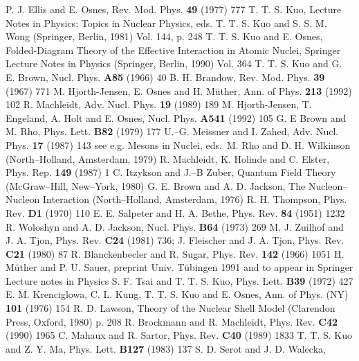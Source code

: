 \clearpage
\footnotesize{\begin{thebibliography}{99}
 P. J. Ellis and E. Osnes, Rev. Mod. Phys. {\bf 49} (1977) 777
 T. T. S. Kuo, Lecture Notes in
Physics; Topics in Nuclear Physics, eds. T. T. S. Kuo and S. S.
M. Wong  (Springer, Berlin, 1981) Vol. 144, p. 248
 T. T. S. Kuo and E. Osnes, Folded-Diagram Theory
of the Effective Interaction in Atomic Nuclei, Springer Lecture
Notes in Physics (Springer, Berlin, 1990) Vol. 364
 T. T. S. Kuo and G. E. Brown, Nucl. Phys. {\bf A85}
(1966) 40
 B. H. Brandow, Rev. Mod. Phys. {\bf 39} (1967) 771
 M. Hjorth-Jensen, E. Osnes and H. M\"{u}ther,
Ann. of Phys.  {\bf 213} (1992) 102
 R. Machleidt, Adv. Nucl. Phys. {\bf 19} (1989) 189
 M. Hjorth-Jensen, T. Engeland, A. Holt and
E. Osnes,
Nucl. Phys. {\bf A541} (1992) 105
 G. E Brown and M. Rho, Phys. Lett. {\bf B82} (1979) 177
 U.--G. Meissner and I. Zahed,
Adv. Nucl. Phys. {\bf 17} (1987) 143
  see e.g. Mesons in Nuclei, eds.\ M. Rho and D. H. Wilkinson
(North--Holland, Amsterdam, 1979)
 R. Machleidt, K. Holinde and C. Elster, Phys. Rep.
{\bf 149} (1987) 1
 C. Itzykson and J.--B Zuber, Quantum Field Theory
(McGraw--Hill, New--York, 1980)
  G. E. Brown and A. D. Jackson, The Nucleon--Nucleon Interaction
(North--Holland, Amsterdam, 1976)
 R. H. Thompson, Phys. Rev. {\bf D1} (1970) 110
 E. E. Salpeter and H. A. Bethe, Phys. Rev. {\bf 84} (1951) 1232
  R. Woloshyn and A. D. Jackson, Nucl. Phys. {\bf B64} (1973) 269
 M. J. Zuilhof and J. A. Tjon, Phys. Rev. {\bf C24} (1981) 736;
J. Fleischer and J. A. Tjon, Phys. Rev. {\bf C21} (1980) 87
 R. Blanckenbecler and R. Sugar, Phys. Rev. {\bf 142} (1966) 1051
 H. M\"{u}ther and P. U. Sauer, preprint Univ. T\"{u}bingen
1991 and to
appear in Springer Lecture notes in Physics
 S. F. Tsai and T. T. S. Kuo, Phys. Lett. {\bf B39} (1972) 427
 E. M. Krenciglowa, C. L. Kung, T. T. S. Kuo and
E. Osnes, Ann. of Phys. (NY) {\bf 101} (1976) 154
 R. D. Lawson, Theory of the Nuclear Shell Model
(Clarendon Press, Oxford, 1980) p. 208
 R. Brockmann and R. Machleidt, Phys. Rev. {\bf C42} (1990) 1965
 C. Mahaux and R. Sartor, Phys. Rev. {\bf C40} (1989) 1833
 T. T. S. Kuo and Z. Y. Ma, Phys. Lett. {\bf B127} (1983) 137
 S. D. Serot and J. D. Walecka,

\end{thebibliography}}
